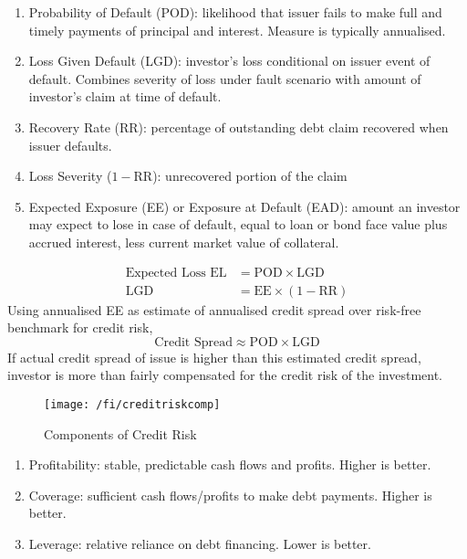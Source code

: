 \begin{remark} 
\begin{enumerate}[label=\roman*.]
\setlength{\itemsep}{0pt}
\item Probability of Default (POD): likelihood that issuer fails to make full and timely payments of principal and interest. Measure is typically annualised.
\item Loss Given Default (LGD): investor's loss conditional on issuer event of default. Combines severity of loss under fault scenario with amount of investor's claim at time of default.
\item Recovery Rate (RR): percentage of outstanding debt claim recovered when issuer defaults.
\item Loss Severity ($1 - \text{RR}$): unrecovered portion of the claim
\item Expected Exposure (EE) or Exposure at Default (EAD): amount an investor may expect to lose in case of default, equal to loan or bond face value plus accrued interest, less current market value of collateral.
\end{enumerate}
\begin{align}
\text{Expected Loss EL} &= \text{POD} \times \text{LGD} \nonumber \\
\text{LGD} &= \text{EE} \times (1 - \text{RR}) \nonumber
\end{align}
Using annualised EE as estimate of annualised credit spread over risk-free benchmark for credit risk,
\begin{equation}
\text{Credit Spread} \approx \text{POD} \times \text{LGD} \nonumber
\end{equation}
If actual credit spread of issue is higher than this estimated credit spread, investor is more than fairly compensated for the credit risk of the investment. 
\end{remark}

\begin{figure}[H]
\centering
\texttt{[image: /fi/creditriskcomp]}
\caption{Components of Credit Risk}
\end{figure}

\begin{remark} 
\begin{enumerate}[label=\roman*.]
\setlength{\itemsep}{0pt}
\item Profitability: stable, predictable cash flows and profits. Higher is better.
\item Coverage: sufficient cash flows/profits to make debt payments. Higher is better.
\item Leverage: relative reliance on debt financing. Lower is better.
\end{enumerate}
\end{remark}


